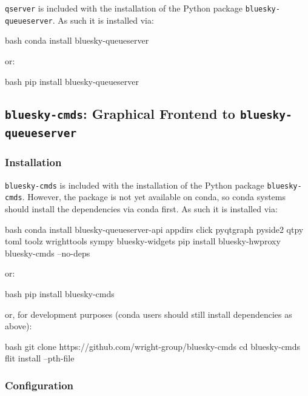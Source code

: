 \texttt{qserver} is included with the installation of the Python package \texttt{bluesky-queueserver}.
As such it is installed via:

\begin{codefragment}{bash}
conda install bluesky-queueserver
\end{codefragment}

or:

\begin{codefragment}{bash}
pip install bluesky-queueserver
\end{codefragment}

\subsection{\texttt{bluesky-cmds}: Graphical Frontend to \texttt{bluesky-queueserver}}

\subsubsection{Installation}

\texttt{bluesky-cmds} is included with the installation of the Python package \texttt{bluesky-cmds}.
However, the package is not yet available on conda, so conda systems should install the dependencies via conda first.
As such it is installed via:

\begin{codefragment}{bash}
conda install bluesky-queueserver-api appdirs click pyqtgraph pyside2 qtpy toml toolz wrighttools sympy bluesky-widgets
pip install bluesky-hwproxy bluesky-cmds --no-deps
\end{codefragment}

or:

\begin{codefragment}{bash}
pip install bluesky-cmds
\end{codefragment}

or, for development purposes (conda users should still install dependencies as above):

\begin{codefragment}{bash}
git clone https://github.com/wright-group/bluesky-cmds
cd bluesky-cmds
flit install --pth-file
\end{codefragment}

\subsubsection{Configuration}

